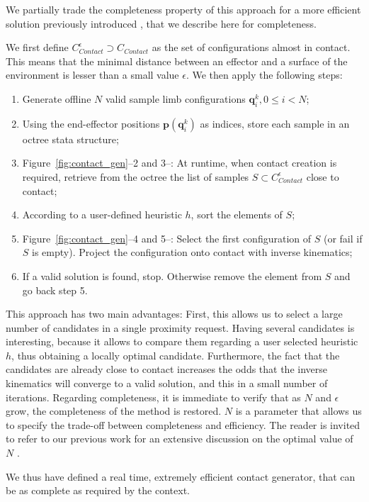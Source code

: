 We partially trade the completeness property of this approach for a more efficient solution previously introduced \citep{Tonneau2014}, that we describe
here for completeness.

We first define $C_{Contact}^{\epsilon} \supset C_{Contact}$ as the set of configurations almost in contact. This means that the minimal distance 
between an effector and a surface of the environment is lesser than a small value $\epsilon$.
We then apply the following steps:
\begin{enumerate}
\item Generate offline $N$ valid sample limb configurations $\mathbf{q}^k_i,  0 \leq i < N$;
\item Using the end-effector positions $\mathbf{p}(\mathbf{q}^k_i)$ as indices, store each sample in an octree stata structure;
\item Figure~\ref{fig:contact_gen}--2 and 3--: At runtime, when contact creation is required, retrieve from the octree the list of samples $S \subset C_{Contact}^{\epsilon}$ close to contact;
\item According to a user-defined heuristic $h$, sort the elements of $S$;
\item Figure~\ref{fig:contact_gen}--4 and 5--: Select the first configuration of $S$ (or fail if $S$ is empty). Project the configuration onto contact with inverse kinematics;
\item If a valid solution is found, stop. Otherwise remove the element from $S$ and go back step 5.
\end{enumerate}

This approach has two main advantages:
First, this allows us to select a large number of candidates in a single proximity request.
Having several candidates is interesting, because it allows to compare them regarding a user selected heuristic $h$, thus obtaining
a locally optimal candidate.
Furthermore, the fact that the candidates are already close to contact increases the odds that the inverse kinematics will converge to a valid solution,
and this in a small number of iterations.
Regarding completeness, it is immediate to verify that as $N$ and $\epsilon$ grow, the completeness of the method is restored.
$N$ is a parameter that allows us to specify the trade-off between completeness and efficiency.
The reader is invited to refer to our previous work for an extensive discussion on the optimal value of $N$ \citep{Tonneau2014}.

We thus have defined a real time, extremely efficient contact generator, that can be as complete as required by the context.

